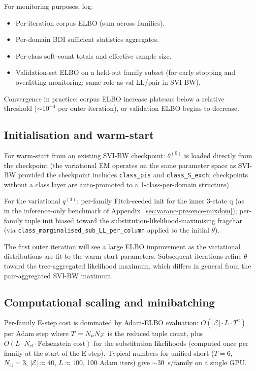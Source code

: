 For monitoring purposes, log:
\begin{itemize}[nosep]
\item Per-iteration corpus ELBO (sum across families).
\item Per-domain BDI sufficient statistics aggregates.
\item Per-class soft-count totals and effective sample size.
\item Validation-set ELBO on a held-out family subset (for early stopping
   and overfitting monitoring; same role as val LL/pair in SVI-BW).
\end{itemize}
Convergence in practice: corpus ELBO increase plateaus below a
relative threshold ($\sim 10^{-4}$ per outer iteration), or
validation ELBO begins to decrease.

\subsection{Initialisation and warm-start}
\label{sec:vbem-init}

For warm-start from an existing SVI-BW checkpoint:
$\theta^{(0)}$ is loaded directly from the checkpoint
(the variational EM operates on the same parameter space as SVI-BW
provided the checkpoint includes \texttt{class\_pis} and
\texttt{class\_S\_exch}; checkpoints without a class layer are
auto-promoted to a 1-class-per-domain structure).

For the variational $q^{(0)}$: per-family Fitch-seeded init for
the inner 3-state q (as in the inference-only benchmark of
Appendix~\ref{sec:varanc-presence-mixdom}); per-family tuple init
biased toward the substitution-likelihood-maximising fragchar (via
\texttt{class\_marginalised\_sub\_LL\_per\_column} applied to the
initial $\theta$).

The first outer iteration will see a large ELBO improvement as the
variational distributions are fit to the warm-start parameters. Subsequent
iterations refine $\theta$ toward the tree-aggregated likelihood
maximum, which differs in general from the pair-aggregated SVI-BW
maximum.

\subsection{Computational scaling and minibatching}
\label{sec:vbem-scaling}

Per-family E-step cost is dominated by Adam-ELBO evaluation:
$O(|\mathcal{E}| \cdot L \cdot T^2)$ per Adam step where $T = N_n
N_{\mathcal{F}}$ is the reduced tuple count, plus $O(L \cdot N_{\mathrm{cl}} \cdot
\text{Felsenstein cost})$ for the substitution likelihoods (computed
once per family at the start of the E-step). Typical numbers for
unified-short ($T = 6$, $N_{\mathrm{cl}} = 3$, $|\mathcal{E}| \approx 40$,
$L \approx 100$, 100 Adam iters) give $\sim 30$~s/family on a single
GPU.

